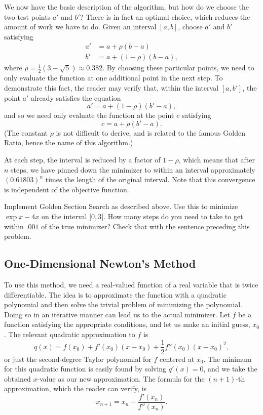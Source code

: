 We now have the basic description of the algorithm, but how do we choose the two test
points $a'$ and $b'$? There is in fact an optimal choice, which reduces the amount of
work we have to do. Given an interval $[a, b]$, choose $a'$ and $b'$ satisfying
\begin{align*}
a' &= a + \rho(b - a) \\
b' &= a + (1 - \rho)(b - a),
\end{align*}
where $\rho = \frac{1}{2}(3 - \sqrt{5}) \approx 0.382$. By choosing these particular
points, we need to only evaluate the function at one additional point in the next step.
To demonstrate this fact, the reader may verify that, within the interval $[a, b']$,
the point $a'$ already satisfies the equation
\begin{equation*}
a' = a + (1 - \rho)(b' - a),
\end{equation*}
and so we need only evaluate the function at the point $c$ satisfying
\begin{equation*}
c = a + \rho(b' - a).
\end{equation*}
(The constant $\rho$ is not difficult to derive, and is related to the famous Golden Ratio, hence the name of this algorithm.)

At each step, the interval is reduced by a factor of $1-\rho$, which means that after
$n$ steps, we have pinned down the minimizer to within an interval approximately
$(0.61803)^n$ times the length of the original interval. Note that this convergence is
independent of the objective function.

\begin{problem}
Implement Golden Section Search as described above. Use this to minimize $\exp{x} - 4x$
on the interval $\lbrack 0, 3 \rbrack$. How many steps do you need to take to get
within $.001$ of the true minimizer? Check that with the sentence preceding this
problem.
\end{problem}

\subsection*{One-Dimensional Newton's Method}
To use this method, we need a real-valued function of a real variable that is twice
differentiable. The idea is to approximate the function with a quadratic polynomial and
then solve the trivial problem of minimizing the polynomial. Doing so in an iterative
manner can lead us to the actual minimizer. Let $f$ be a function satisfying the
appropriate conditions, and let us make an initial guess, $x_0$. The relevant quadratic
approximation to $f$ is
\begin{equation*}
q(x) = f(x_0) + f'(x_0)(x-x_0) + \frac{1}{2}f''(x_0)(x-x_0)^2,
\end{equation*}
or just the second-degree Taylor polynomial for $f$ centered at $x_0$. The minimum
for this quadratic function is easily found by solving $q'(x) = 0$, and we take the
obtained $x$-value as our new approximation. The formula for the $(n+1)$-th
approximation, which the reader can verify, is
\begin{equation*}
x_{n+1} = x_n - \frac{f'(x_n)}{f''(x_n)}.
\end{equation*}

